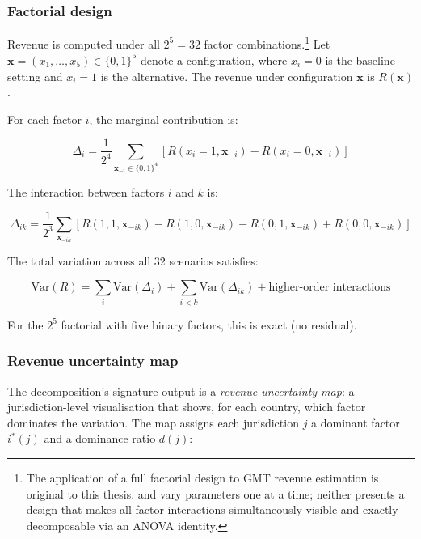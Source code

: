 \documentclass[11pt,a4paper]{article}
\begin{document}
\subsubsection{Factorial design}\label{sec:factorial}

Revenue is computed under all $2^5 = 32$ factor combinations.\footnote{The application of a full factorial design to GMT revenue estimation is original to this thesis. \citet{barake2022} and \citet{hugger2026} vary parameters one at a time; neither presents a design that makes all factor interactions simultaneously visible and exactly decomposable via an ANOVA identity.} Let $\mathbf{x} = (x_1, \ldots, x_5) \in \{0, 1\}^5$ denote a configuration, where $x_i = 0$ is the baseline setting and $x_i = 1$ is the alternative. The revenue under configuration $\mathbf{x}$ is $R(\mathbf{x})$.

For each factor $i$, the marginal contribution is:

\begin{equation}\label{eq:marginal}
\Delta_i = \frac{1}{2^4} \sum_{\mathbf{x}_{-i} \in \{0,1\}^4} \left[R(x_i = 1, \mathbf{x}_{-i}) - R(x_i = 0, \mathbf{x}_{-i})\right]
\end{equation}

The interaction between factors $i$ and $k$ is:

\begin{equation}\label{eq:interaction}
\Delta_{ik} = \frac{1}{2^3} \sum_{\mathbf{x}_{-ik}} \left[R(1, 1, \mathbf{x}_{-ik}) - R(1, 0, \mathbf{x}_{-ik}) - R(0, 1, \mathbf{x}_{-ik}) + R(0, 0, \mathbf{x}_{-ik})\right]
\end{equation}

The total variation across all 32 scenarios satisfies:

\begin{equation}\label{eq:anova}
\text{Var}(R) = \sum_i \text{Var}(\Delta_i) + \sum_{i < k} \text{Var}(\Delta_{ik}) + \text{higher-order interactions}
\end{equation}

For the $2^5$ factorial with five binary factors, this is exact (no residual).

\subsubsection{Revenue uncertainty map}\label{sec:uncertainty_map}

The decomposition's signature output is a \emph{revenue uncertainty map}: a jurisdiction-level visualisation that shows, for each country, which factor dominates the variation. The map assigns each jurisdiction $j$ a dominant factor $i^*(j)$ and a dominance ratio $d(j)$:
\end{document}
